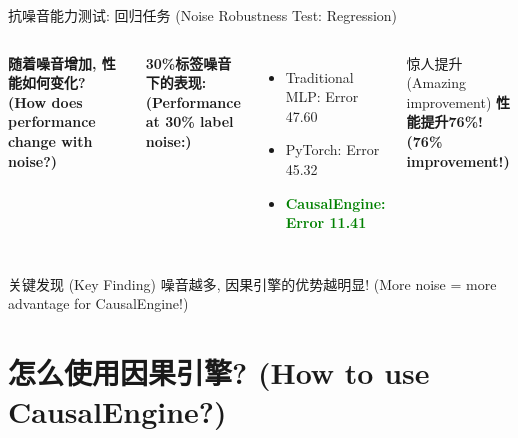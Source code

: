 \documentclass[aspectratio=169,12pt]{beamer}
\begin{document}
\begin{frame}{抗噪音能力测试: 回归任务 (Noise Robustness Test: Regression)}
\begin{columns}
\begin{center}
\textbf{随着噪音增加, 性能如何变化? (How does performance change with noise?)}
\end{center}

\textbf{30\%标签噪音下的表现: (Performance at 30\% label noise:)}
\begin{itemize}
    \item Traditional MLP: Error 47.60
    \item PyTorch: Error 45.32
    \item \textcolor{green}{\textbf{CausalEngine: Error 11.41}}
\end{itemize}

\vspace{1em}
\begin{alertblock}{惊人提升 (Amazing improvement)}
\textbf{性能提升76\%! (76\% improvement!)}
\end{alertblock}
\end{columns}

\vspace{1em}
\begin{block}{关键发现 (Key Finding)}
噪音越多, 因果引擎的优势越明显! (More noise = more advantage for CausalEngine!)
\end{block}
\end{frame}

\section{怎么使用因果引擎? (How to use CausalEngine?)}
\end{document}
